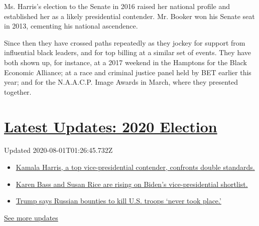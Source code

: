 Ms. Harris's election to the Senate in 2016 raised her national profile
and established her as a likely presidential contender. Mr. Booker won
his Senate seat in 2013, cementing his national ascendence.

Since then they have crossed paths repeatedly as they jockey for support
from influential black leaders, and for top billing at a similar set of
events. They have both shown up, for instance, at a 2017 weekend in the
Hamptons for the Black Economic Alliance; at a race and criminal justice
panel held by BET earlier this year; and for the N.A.A.C.P. Image Awards
in March, where they presented together.

\hypertarget{latest-updates-2020-election}{%
\section{\texorpdfstring{\href{https://www.nytimes.com/2020/07/31/us/elections/biden-vs-trump.html?action=click\&pgtype=Article\&state=default\&region=MAIN_CONTENT_1\&context=storylines_live_updates}{Latest
Updates: 2020
Election}}{Latest Updates: 2020 Election}}\label{latest-updates-2020-election}}

Updated 2020-08-01T01:26:45.732Z

\begin{itemize}
\tightlist
\item
  \href{https://www.nytimes.com/2020/07/31/us/elections/biden-vs-trump.html?action=click\&pgtype=Article\&state=default\&region=MAIN_CONTENT_1\&context=storylines_live_updates\#link-29fdff45}{Kamala
  Harris, a top vice-presidential contender, confronts double
  standards.}
\item
  \href{https://www.nytimes.com/2020/07/31/us/elections/biden-vs-trump.html?action=click\&pgtype=Article\&state=default\&region=MAIN_CONTENT_1\&context=storylines_live_updates\#link-13ec3d9c}{Karen
  Bass and Susan Rice are rising on Biden's vice-presidential
  shortlist.}
\item
  \href{https://www.nytimes.com/2020/07/31/us/elections/biden-vs-trump.html?action=click\&pgtype=Article\&state=default\&region=MAIN_CONTENT_1\&context=storylines_live_updates\#link-49e9a016}{Trump
  says Russian bounties to kill U.S. troops `never took place.'}
\end{itemize}

\href{https://www.nytimes.com/2020/07/31/us/elections/biden-vs-trump.html?action=click\&pgtype=Article\&state=default\&region=MAIN_CONTENT_1\&context=storylines_live_updates}{See
more updates}

